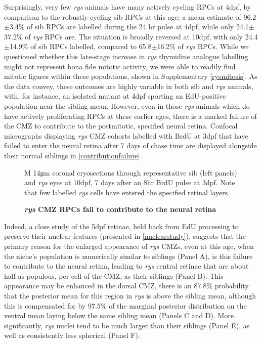 Surprisingly, very few \textit{rys} animals have many actively cycling RPCs at 4dpf, by comparison to the robustly cycling sib RPCs at this age; a mean estimate of 96.2$\pm$3.4\% of sib RPCs are labelled during the 24 hr pulse at 4dpf, while only 24.1$\pm$37.2\% of \textit{rys} RPCs are. The situation is broadly reversed at 10dpf, with only 24.4$\pm$14.9\% of sib RPCs labelled, compared to 65.8$\pm$16.2\% of \textit{rys} RPCs. While we questioned whether this late-stage increase in \textit{rys} thymidine analogue labelling might not represent bona fide mitotic activity, we were able to readily find mitotic figures within these populations, shown in Supplementary \autoref{rysmitosis}. As the data convey, these outcomes are highly variable in both sib and \textit{rys} animals, with, for instance, an isolated mutant at 4dpf sporting an EdU-positive population near the sibling mean. However, even in those \textit{rys} animals which do have actively proliferating RPCs at these earlier ages, there is a marked failure of the CMZ to contribute to the postmitotic, specified neural retina. Confocal micrographs displaying \textit{rys} CMZ cohorts labelled with BrdU at 3dpf that have failed to enter the neural retina after 7 days of chase time are displayed alongside their normal siblings in \autoref{contributionfailure}. 

\begin{figure}[!h]
    \caption{{\bf \textit{rys} CMZ RPCs fail to contribute to the neural retina}} M
    14\si{\micro\metre} coronal cryosections through representative sib (left panels) and \textit{rys} eyes at 10dpf, 7 days after an 8hr BrdU pulse at 3dpf. Note that few labelled \textit{rys} cells have entered the specified retinal layers.
    \label{contributionfailure}
\end{figure}
\FloatBarrier

Indeed, a close study of the 5dpf retinae, held back from EdU processing to preserve their nuclear features (presented in \autoref{nuclearstudy}), suggests that the primary reason for the enlarged appearance of \textit{rys} CMZs, even at this age, when the niche's population is numerically similar to siblings (Panel A), is this failure to contribute to the neural retina, leading to \textit{rys} central retinae that are about half as populous, per cell of the CMZ, as their siblings (Panel B). This appearance may be enhanced in the dorsal CMZ, there is an  87.8\% probability that the posterior mean for this region in \textit{rys} is above the sibling mean, although this is compensated for by 97.5\% of the marginal posterior distribution on the ventral mean laying below the same sibling mean (Panels C and D). More significantly, \textit{rys} nuclei tend to be much larger than their siblings (Panel E), as well as consistently less spherical (Panel F).

